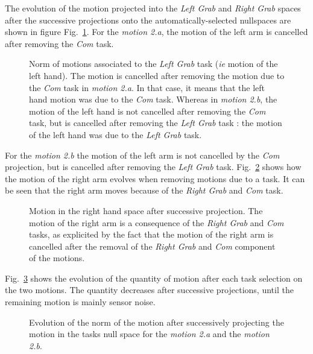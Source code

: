 \documentclass[letterpaper, 10pt, conference]{ieeeconf}      %
\begin{document}
The evolution of the motion projected into the \emph{Left Grab} and \emph{Right Grab}
spaces after the successive projections onto the automatically-selected nullspaces
are shown in figure Fig.~\ref{fig:exp1:Evolution2L}. For the \emph{motion 2.a},
the motion of the left arm is cancelled after removing the \emph{Com} task.
\begin{figure}[t]
  \centering
  \subfigure[Motion 2.a]{
  \resizebox{.48\textwidth}{!} {
  
  }                           
  \label{fig:exp1:Evolution2L:a}
  }
  \subfigure[Motion 2.b]{
  \resizebox{.48\textwidth}{!} {
  
  }
  \label{fig:exp1:Evolution2L:b}
  }
  \caption{Norm of motions associated to the \emph{Left Grab} task (\emph{ie} motion of the left hand).
  The motion is cancelled after removing the motion due to the \emph{Com} task
  in \emph{motion 2.a}. In that case, it means that the left hand motion was due to the \emph{Com} task.
  Whereas in \emph{motion 2.b}, the motion of the left hand is not cancelled after
  removing the \emph{Com} task, but is cancelled after removing
  the \emph{Left Grab} task : the motion of the left hand was due
  to the \emph{Left Grab} task.}
  \label{fig:exp1:Evolution2L}
\end{figure}
For the \emph{motion 2.b} the motion of the left arm is
not cancelled by the \emph{Com} projection, but is cancelled after
removing the \emph{Left Grab} task.
Fig.~\ref{fig:exp1:Evolution2R} shows how the motion of the right arm evolves when removing
motions due to a task. It can be seen that the right arm moves because of the \emph{Right Grab} and
\emph{Com} task.
\begin{figure}[t]
  \centering
  \subfigure[Motion 2.a]{
  \resizebox{.48\textwidth}{!} {
  
  }                           
  \label{fig:exp1:Evolution2R:a}
  }
  \subfigure[Motion 2.b]{
  \resizebox{.48\textwidth}{!} {
  
  }
  \label{fig:exp1:Evolution2R:b}
  }
  \caption{Motion in the right hand space after successive projection.
  The motion of the right arm is a consequence of the  
  \emph{Right Grab} and \emph{Com} tasks, as explicited by the fact
  that the motion of the right arm is cancelled
  after the removal of the \emph{Right Grab} and \emph{Com} component of the motions.}
  \label{fig:exp1:Evolution2R}
\end{figure}
Fig.~\ref{fig:exp1:PqdotNorms} shows the evolution of the quantity of motion after each task selection
on the two motions. The quantity decreases after successive projections, until the remaining motion 
is mainly sensor noise.
\begin{figure}[t]
  \centering
  \subfigure[Motion 2.a]{
  \resizebox{.48\textwidth}{!} {
    
  }
  \label{fig:exp1:PqdotNormsR}
  }
  \subfigure[Motion 2.b]{
  \resizebox{.48\textwidth}{!} {
    
  }
\label{fig:exp1:PqdotNormsRL}
}
\caption{Evolution of the norm of the motion after successively projecting the motion in the tasks null space for
the \emph{motion 2.a} and the \emph{motion 2.b}.}
\label{fig:exp1:PqdotNorms}
\end{figure}
\end{document}
